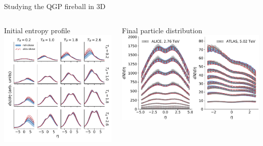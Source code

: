 \documentclass{beamer}
\begin{document}
\begin{frame}{Studying the QGP fireball in 3D}
  \vspace{1cm}
  \begin{columns}
    \begin{column}{.4\textwidth}
      \begin{center}
        Initial entropy profile\\
        \includegraphics[width=\textwidth]{post_dsdy}
      \end{center}
    \end{column}
    \begin{column}{.6\textwidth}
      \begin{center}
        Final particle distribution\\
        \includegraphics[width=\textwidth]{post_obs}

\end{center}
\end{column}
\end{columns}
\end{frame}
\end{document}
